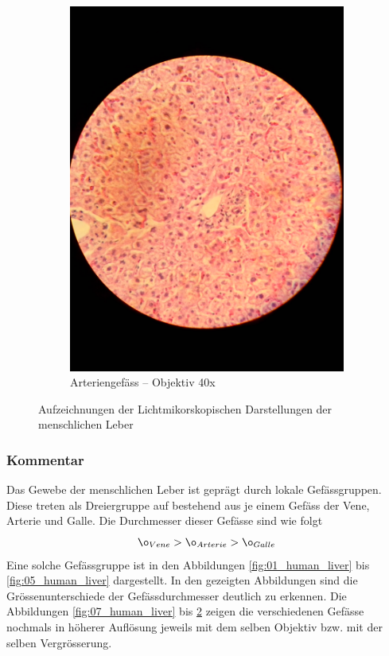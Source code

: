 \begin{figure}[h!]
\begin{subfigure}[b]{0.3\textwidth}
		\includegraphics[width=1\textwidth]{../images/10_human_liver.jpg}
		\caption{Arteriengefäss -- Objektiv 40x}
		\label{fig:10_human_liver}
	\end{subfigure}
	\caption{Aufzeichnungen der Lichtmikorskopischen Darstellungen der
		menschlichen Leber}
\end{figure}

\subsubsection{Kommentar}
Das Gewebe der menschlichen Leber ist geprägt durch lokale Gefässgruppen.
Diese treten als Dreiergruppe auf bestehend aus je einem Gefäss der Vene,
Arterie und Galle. Die Durchmesser dieser Gefässe sind wie folgt
\[ 
	\o_{Vene} > \o_{Arterie} > \o_{Galle}
\]
Eine solche Gefässgruppe ist in den Abbildungen \ref{fig:01_human_liver}
bis \ref{fig:05_human_liver} dargestellt. In den gezeigten Abbildungen
sind die Grössenunterschiede der Gefässdurchmesser deutlich zu erkennen.
Die Abbildungen \ref{fig:07_human_liver} bis \ref{fig:10_human_liver}
zeigen die verschiedenen Gefässe nochmals in höherer Auflösung jeweils
mit dem selben Objektiv bzw. mit der selben Vergrösserung.

